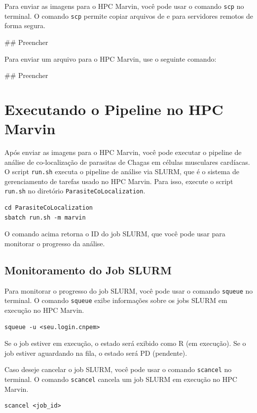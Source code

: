 \documentclass{article}
\begin{document}
Para enviar as imagens para o HPC Marvin, você pode usar o comando \texttt{scp} no terminal. O comando \texttt{scp} permite copiar arquivos de e para servidores remotos de forma segura.

## Preencher

Para enviar um arquivo para o HPC Marvin, use o seguinte comando:

## Preencher

\section{Executando o Pipeline no HPC Marvin}

Após enviar as imagens para o HPC Marvin, você pode executar o pipeline de análise de co-localização de parasitas de Chagas em células musculares cardíacas. O script \texttt{run.sh} executa o pipeline de análise via SLURM, que é o sistema de gerenciamento de tarefas usado no HPC Marvin. Para isso, execute o script \texttt{run.sh} no diretório \texttt{ParasiteCoLocalization}.

\begin{verbatim}
cd ParasiteCoLocalization
sbatch run.sh -m marvin
\end{verbatim}

O comando acima retorna o ID do job SLURM, que você pode usar para monitorar o progresso da análise.

\subsection{Monitoramento do Job SLURM}

Para monitorar o progresso do job SLURM, você pode usar o comando \texttt{squeue} no terminal. O comando \texttt{squeue} exibe informações sobre os jobs SLURM em execução no HPC Marvin.

\begin{verbatim}
squeue -u <seu.login.cnpem>
\end{verbatim}

Se o job estiver em execução, o estado será exibido como R (em execução). Se o job estiver aguardando na fila, o estado será PD (pendente).

Caso deseje cancelar o job SLURM, você pode usar o comando \texttt{scancel} no terminal. O comando \texttt{scancel} cancela um job SLURM em execução no HPC Marvin.

\begin{verbatim}
scancel <job_id>
\end{verbatim}
\end{document}
